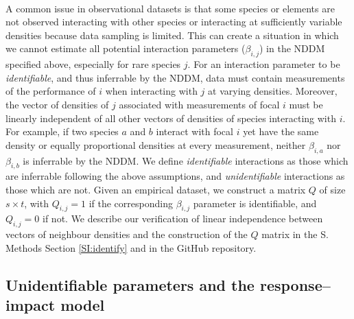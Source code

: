 \documentclass[a4,12pt]{article}
\begin{document}
\begin{refsection}
    \paragraph{}
    A common issue in observational datasets is that some species or elements are not observed interacting with other species or interacting at sufficiently variable densities because data sampling is limited. This can create a situation in which we cannot estimate all potential interaction parameters ($\beta_{i,j}$) in the NDDM specified above, especially for rare species $j$. For an interaction parameter to be \textit{identifiable}, and thus inferrable by the NDDM, data must contain measurements of the performance of $i$ when interacting with $j$ at varying densities. Moreover, the vector of densities of $j$ associated with measurements of focal $i$ must be linearly independent of all other vectors of densities of species interacting with $i$. For example, if two species $a$ and $b$ interact with focal $i$ yet have the same density or equally proportional densities at every measurement, neither $\beta_{i, a}$ nor $\beta_{i, b}$ is inferrable by the NDDM. We define \textit{identifiable} interactions as those which are inferrable following the above assumptions, and \textit{unidentifiable} interactions as those which are not. Given an empirical dataset, we construct a matrix $Q$ of size $s \times t$, with $Q_{i, j} = 1$ if the corresponding $\beta_{i, j}$ parameter is identifiable, and $Q_{i, j} = 0$ if not. We describe our verification of linear independence between vectors of neighbour densities and the construction of the $Q$ matrix in the S. Methods Section \ref{SI:identify} and in the GitHub repository.
    
    \subsection{Unidentifiable parameters and the response--impact model}
    \label{meth:rim}


\end{refsection}
\end{document}
